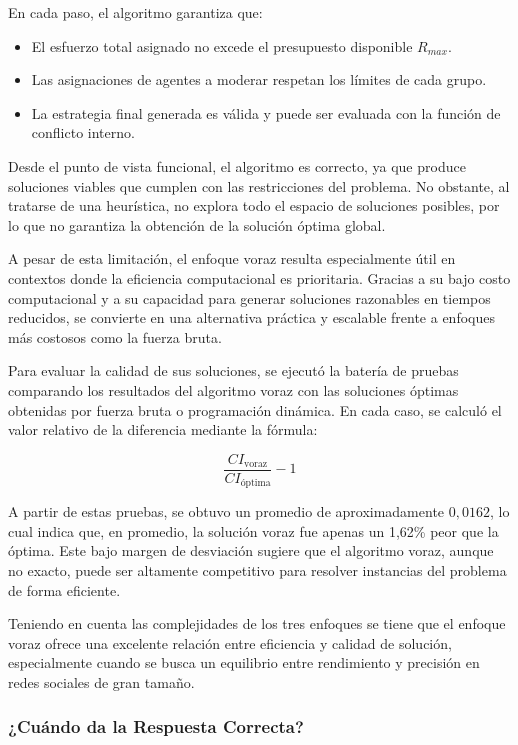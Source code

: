 \documentclass[11pt,letter]{article}
\begin{document}
En cada paso, el algoritmo garantiza que:
\begin{itemize}
    \item El esfuerzo total asignado no excede el presupuesto disponible $R_{max}$.
    \item Las asignaciones de agentes a moderar respetan los límites de cada grupo.
    \item La estrategia final generada es válida y puede ser evaluada con la función de conflicto interno.
\end{itemize}

Desde el punto de vista funcional, el algoritmo es correcto, ya que produce soluciones viables que cumplen con las restricciones del problema. No obstante, al tratarse de una heurística, no explora todo el espacio de soluciones posibles, por lo que no garantiza la obtención de la solución óptima global.

A pesar de esta limitación, el enfoque voraz resulta especialmente útil en contextos donde la eficiencia computacional es prioritaria. Gracias a su bajo costo computacional y a su capacidad para generar soluciones razonables en tiempos reducidos, se convierte en una alternativa práctica y escalable frente a enfoques más costosos como la fuerza bruta.

Para evaluar la calidad de sus soluciones, se ejecutó la batería de pruebas comparando los resultados del algoritmo voraz con las soluciones óptimas obtenidas por fuerza bruta o programación dinámica. En cada caso, se calculó el valor relativo de la diferencia mediante la fórmula:

\[
\frac{CI_{\text{voraz}}}{CI_{\text{óptima}}} - 1
\]
\vspace{0.5cm}

A partir de estas pruebas, se obtuvo un promedio de aproximadamente $0{,}0162$, lo cual indica que, en promedio, la solución voraz fue apenas un 1,62\% peor que la óptima. Este bajo margen de desviación sugiere que el algoritmo voraz, aunque no exacto, puede ser altamente competitivo para resolver instancias del problema de forma eficiente.


Teniendo en cuenta las complejidades de los tres enfoques se tiene que el enfoque voraz ofrece una excelente relación entre eficiencia y calidad de solución, especialmente cuando se busca un equilibrio entre rendimiento y precisión en redes sociales de gran tamaño.

\subsubsection{¿Cuándo da la Respuesta Correcta?}
\end{document}
